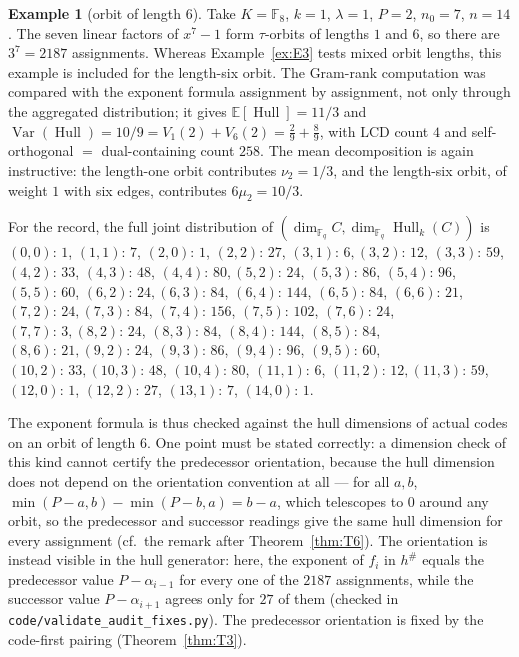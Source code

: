 \documentclass[10pt,journal,draftclsnofoot,onecolumn]{IEEEtran}
\theoremstyle{definition}
\newtheorem{example}[theorem]{Example}
\theoremstyle{remark}
\newcommand{\Fq}{\mathbb{F}_q}
\newcommand{\Hull}{\operatorname{Hull}}
\newcommand{\E}{\mathbb{E}}
\begin{document}
\begin{example}[orbit of length \(6\)]\label{ex:E4}
Take \(K = \mathbb{F}_8\), \(k=1\), \(\lambda=1\), \(P=2\), \(n_0=7\),
\(n=14\). The seven linear factors of \(x^7-1\) form \(\tau\)-orbits
of lengths \(1\) and \(6\), so there are \(3^7 = 2187\) assignments.
Whereas Example~\ref{ex:E3} tests mixed orbit lengths, this example is
included for the length-six orbit. The Gram-rank computation was
compared with the exponent formula assignment by assignment, not only
through the aggregated distribution; it gives
\(\E[\Hull] = 11/3\) and
\(\operatorname{Var}(\Hull) = 10/9 = V_1(2) + V_6(2) = \tfrac29 +
\tfrac89\), with LCD count \(4\) and self-orthogonal \(=\) dual-containing
count \(258\). The mean decomposition is again instructive: the
length-one orbit contributes \(\nu_2 = 1/3\), and the length-six orbit,
of weight \(1\) with six edges, contributes \(6\mu_2 = 10/3\).

For the record, the full joint distribution of
\((\dim_{\Fq} C, \dim_{\Fq}\Hull_k(C))\) is
{\footnotesize
\((0,0){:}\,1\), \((1,1){:}\,7\), \((2,0){:}\,1\), \((2,2){:}\,27\), \((3,1){:}\,6,
(3,2){:}\,12\), \((3,3){:}\,59\), \((4,2){:}\,33\), \((4,3){:}\,48\), \((4,4){:}\,80,
(5,2){:}\,24\), \((5,3){:}\,86\), \((5,4){:}\,96\), \((5,5){:}\,60\), \((6,2){:}\,24,
(6,3){:}\,84\), \((6,4){:}\,144\), \((6,5){:}\,84\), \((6,6){:}\,21\), \((7,2){:}\,24,
(7,3){:}\,84\), \((7,4){:}\,156\), \((7,5){:}\,102\), \((7,6){:}\,24\), \((7,7){:}\,3,
(8,2){:}\,24\), \((8,3){:}\,84\), \((8,4){:}\,144\), \((8,5){:}\,84\), \((8,6){:}\,21,
(9,2){:}\,24\), \((9,3){:}\,86\), \((9,4){:}\,96\), \((9,5){:}\,60\), \((10,2){:}\,33,
(10,3){:}\,48\), \((10,4){:}\,80\), \((11,1){:}\,6\), \((11,2){:}\,12,
(11,3){:}\,59\), \((12,0){:}\,1\), \((12,2){:}\,27\), \((13,1){:}\,7\), \((14,0){:}\,1\).}

The exponent formula is thus checked against the hull dimensions of
actual codes on an orbit of length \(6\). One point must be stated
correctly: a dimension check of this kind cannot certify the predecessor
orientation, because the hull dimension does not depend on the
orientation convention at all --- for all \(a, b\),
\(\min(P-a,b) - \min(P-b,a) = b - a\), which telescopes to \(0\) around
any orbit, so the predecessor and successor readings give the same hull
dimension for every assignment (cf.\ the remark after
Theorem~\ref{thm:T6}). The orientation is instead visible in the hull
generator: here, the exponent of \(f_i\) in \(h^{\#}\) equals the
predecessor value \(P - \alpha_{i-1}\) for every one of the \(2187\)
assignments, while the successor value \(P - \alpha_{i+1}\) agrees only
for \(27\) of them (checked in
\texttt{code/validate\_audit\_fixes.py}). The predecessor orientation is
fixed by the code-first pairing (Theorem~\ref{thm:T3}).
\end{example}
\end{document}
